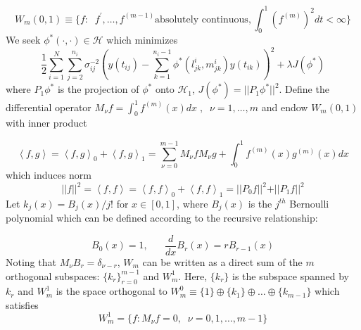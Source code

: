 \[W_m\left(0,1\right) \equiv \lbrace f: \;\;f^\prime, \dots, f^{\left( m-1 \right)} \mbox{absolutely continuous}, \int_0^1 \left(f^{\left( m \right)}\right)^2 dt < \infty \rbrace\]
\noindent
We seek $\phi^*\left(\cdot, \cdot \right) \in \mathcal{H}$ which minimizes
\begin{equation}
\frac{1}{2}\sum_{i=1}^N \sum_{j=2}^{n_i} {\sigma^{-2}_{ij}}\left( y\left(t_{ij}\right) - \sum_{k=1}^{n_i - 1}\phi^*\left(l^i_{jk},m^i_{jk} \right)y\left(t_{ik}\right) \right)^2 + \lambda J\left(\phi^*\right)  
\label{eq:objectivefun}
\end{equation}
\noindent
where $P_1 \phi^*$ is the projection of $\phi^*$ onto $\mathcal{H}_1$, $J\left(\phi^*\right) = \vert \vert P_1 \phi^* \vert \vert^2$. Define the differential operator $M_\nu f = \int_0^1 f^{\left( m \right)}\left(x\right) dx\;,\;\; \nu = 1, \dots, m$ and endow $W_m\left(0,1\right)$ with inner product

\begin{equation}
\left< f,g\right> = \left< f,g\right>_0 + \left< f,g\right>_1 = \sum_{\nu=0}^{m-1} M_\nu f M_\nu g + \int_0^1 f^{\left( m \right)}\left(x\right)g^{\left( m \right)}\left(x\right)dx
\end{equation}
\noindent
which induces norm 
\[
\vert \vert f \vert \vert^2 = \left< f,f\right> = \left< f,f\right>_0 + \left< f,f\right>_1 = \vert \vert P_0 f \vert \vert^2 + \vert \vert P_1 f \vert \vert^2
\]
\noindent
Let $k_j\left(x\right) = B_j\left(x\right)/{j!}$ for $x \in \left[0,1\right]$, where $B_j\left(x\right)$ is the $j^{th}$ Bernoulli polynomial which can be defined according to the recursive relationship:

\[
B_0\left(x\right) = 1,\;\;\;\;\;\; \frac{d}{dx} B_r\left(x\right) = rB_{r-1}\left(x\right)
\]
\noindent
Noting that $M_\nu B_r = \delta_{\nu-r}$, $W_m$ can be written as a direct sum of the $m$ orthogonal subspaces: $\lbrace k_r \rbrace_{r=0}^{m-1}$ and $W_m^1$.   Here, $\lbrace k_r \rbrace$ is the subspace spanned by $k_r$ and $W_m^1$ is the space orthogonal to $W_m^0 \equiv \lbrace 1 \rbrace \oplus \lbrace k_1 \rbrace \oplus \dots \oplus \lbrace k_{m-1} \rbrace$ which satisfies 
\[
W_m^1 = \lbrace f: M_\nu f = 0,\;\; \nu = 0,1,\dots, m-1\rbrace
\]

